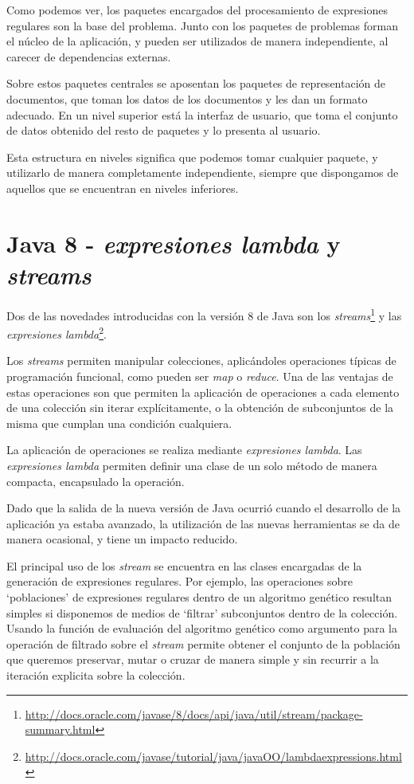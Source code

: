 
Como podemos ver, los paquetes encargados del procesamiento de expresiones regulares son la base del problema.
Junto con los paquetes de problemas forman el núcleo de la aplicación, y pueden ser utilizados de manera independiente, al carecer de dependencias externas.

Sobre estos paquetes centrales se aposentan los paquetes de representación de documentos, que toman los datos de los documentos y les dan un formato adecuado.
En un nivel superior está la interfaz de usuario, que toma el conjunto de datos obtenido del resto de paquetes y lo presenta al usuario.

Esta estructura en niveles significa que podemos tomar cualquier paquete, y utilizarlo de manera completamente independiente, siempre que dispongamos de aquellos que se encuentran en niveles inferiores.

\section{Java 8 - \emph{expresiones lambda} y \emph{streams}}
Dos de las novedades introducidas con la versión 8 de Java son los \emph{streams}\footnote{\url{http://docs.oracle.com/javase/8/docs/api/java/util/stream/package-summary.html}} y las \emph{expresiones lambda}\footnote{\url{http://docs.oracle.com/javase/tutorial/java/javaOO/lambdaexpressions.html}}.

Los \emph{streams} permiten manipular colecciones, aplicándoles operaciones típicas de programación funcional, como pueden ser \emph{map} o \emph{reduce}.
Una de las ventajas de estas operaciones son que permiten la aplicación de operaciones a cada elemento de una colección sin iterar explícitamente, o la obtención de subconjuntos de la misma que cumplan una condición cualquiera.

La aplicación de operaciones se realiza mediante \emph{expresiones lambda}.
Las \emph{expresiones lambda} permiten definir una clase de un solo método de manera compacta, encapsulado la operación.

Dado que la salida de la nueva versión de Java ocurrió cuando el desarrollo de la aplicación ya estaba avanzado, la utilización de las nuevas herramientas se da de manera ocasional, y tiene un impacto reducido.

El principal uso de los \emph{stream} se encuentra en las clases encargadas de la generación de expresiones regulares.
Por ejemplo, las operaciones sobre `poblaciones' de expresiones regulares dentro de un algoritmo genético resultan simples si disponemos de medios de `filtrar' subconjuntos dentro de la colección.
Usando la función de evaluación del algoritmo genético como argumento para la operación de filtrado sobre el \emph{stream} permite obtener el conjunto de la población que queremos preservar, mutar o cruzar de manera simple y sin recurrir a la iteración explicita sobre la colección.

